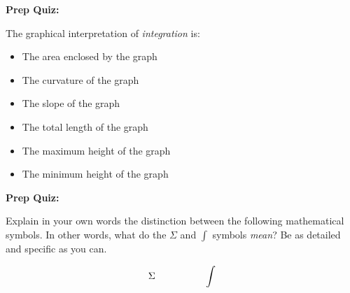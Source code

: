 \vfil \eject

\noindent
{\bf Prep Quiz:}

The graphical interpretation of {\it integration} is:

\begin{itemize}
\item{} The area enclosed by the graph
\vskip 5pt 
\item{} The curvature of the graph
\vskip 5pt 
\item{} The slope of the graph
\vskip 5pt 
\item{} The total length of the graph
\vskip 5pt 
\item{} The maximum height of the graph
\vskip 5pt 
\item{} The minimum height of the graph
\end{itemize}






\vfil \eject

\noindent
{\bf Prep Quiz:}

Explain in your own words the distinction between the following mathematical symbols.  In other words, what do the $\Sigma$ and $\int$ symbols {\it mean}?  Be as detailed and specific as you can.

$$\Sigma \hskip 50pt \int$$




